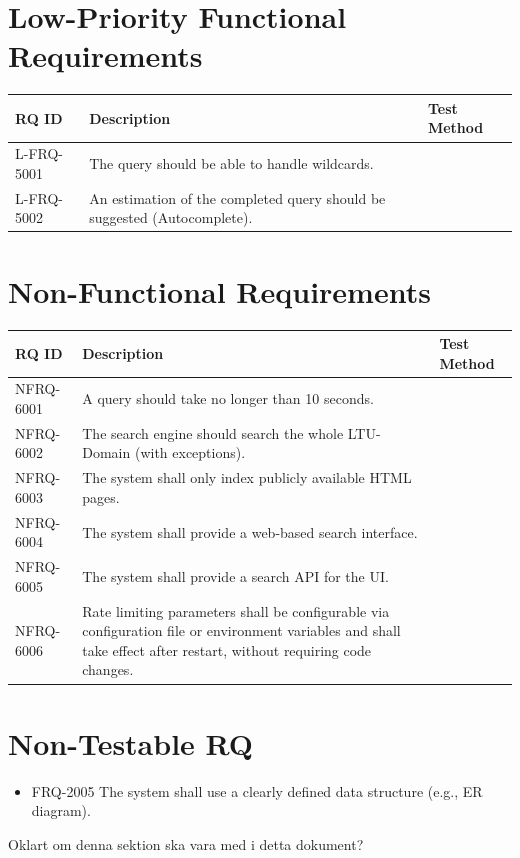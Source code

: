 \documentclass{article}
\begin{document}
\section{Low-Priority Functional Requirements}
\begin{longtable}{@{}p{2.2cm} p{9cm} p{4.5cm}@{}}
\toprule
\textbf{RQ ID} & \textbf{Description} & \textbf{Test Method} \\
\midrule
L-FRQ-5001 & The query should be able to handle wildcards. & \\
L-FRQ-5002 & An estimation of the completed query should be suggested (Autocomplete). & \\
\bottomrule
\end{longtable}

\section{Non-Functional Requirements}
\begin{longtable}{@{}p{2.2cm} p{9cm} p{4.5cm}@{}}
\toprule
\textbf{RQ ID} & \textbf{Description} & \textbf{Test Method} \\
\midrule
NFRQ-6001 & A query should take no longer than 10 seconds. & \\
NFRQ-6002 & The search engine should search the whole LTU-Domain (with exceptions). & \\
NFRQ-6003 & The system shall only index publicly available HTML pages. & \\
NFRQ-6004 & The system shall provide a web-based search interface. & \\
NFRQ-6005 & The system shall provide a search API for the UI. & \\
NFRQ-6006 & Rate limiting parameters shall be configurable via configuration file or environment variables and shall take effect after restart, without requiring code changes. & \\
\bottomrule
\end{longtable}


\section{Non-Testable RQ}
\begin{itemize}
  \item FRQ-2005 The system shall use a clearly defined data structure (e.g., ER diagram).
\end{itemize}
Oklart om denna sektion ska vara med i detta dokument?
\end{document}
